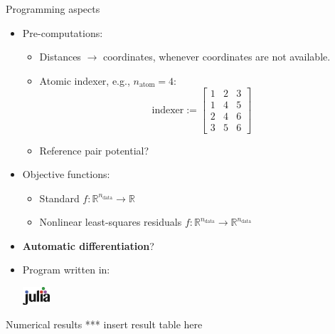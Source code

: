 \documentclass{beamer}
\begin{document}
\begin{frame}{Programming aspects}
    \begin{itemize}
        \item Pre-computations:
        \begin{itemize}
            \item Distances $\to$ coordinates, whenever coordinates are not available.
            \item Atomic indexer, e.g., $n_\text{atom} = 4$:
            \begin{equation*}
                \text{indexer} := 
                \begin{bmatrix}
                    1 & 2 & 3\\
                    1 & 4 & 5\\
                    2 & 4 & 6\\
                    3 & 5 & 6
                \end{bmatrix}
            \end{equation*}  
            \item {\color{blue}Reference pair potential}?
        \end{itemize}
        \item Objective functions:
        \begin{itemize}
            \item Standard $f:\mathbb{R}^{n_\text{data}} \to \mathbb{R}$
            \item Nonlinear least-squares residuals $f:\mathbb{R}^{n_\text{data}} \to \mathbb{R}^{n_\text{data}}$
        \end{itemize}
        \item {\color{red} \textbf{Automatic differentiation}}?
        \item Program written in:
            \begin{center}
                \includegraphics[width = 1cm]{img/slide/Julia_Programming_Language_Logo.svg.png} \hspace*{7cm}
            \end{center}
    \end{itemize}
\end{frame}

\begin{frame}{Numerical results}
    *** insert result table here
\end{frame}
\end{document}
